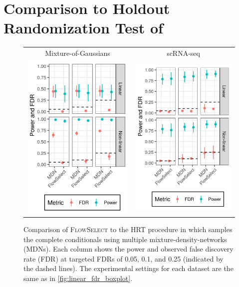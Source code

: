 \documentclass{article}
\newcommand{\FlowSelect}{\textsc{FlowSelect}\xspace}
\begin{document}
\section{Comparison to Holdout Randomization Test of \citet{tanseyHoldoutRandomizationTest2019}} \label{sec:hrt_ablation}
\begin{figure}[!h]
  \centering
    \begin{tabular}{cc}
    Mixture-of-Gaussians & scRNA-seq \\
    \includegraphics[width=0.30\linewidth]{./fig/gaussian_ar_mixture_d100_n100000_rho0.98__meanplots_hrt.png}
        &\includegraphics[width=0.30\linewidth]{./fig/rnasq_cor_a40_n10_nv100_nvc5_nt100000__meanplots_hrt.png}
            \end{tabular}
            \caption{Comparison of \FlowSelect to the HRT procedure in \citet{tanseyHoldoutRandomizationTest2019} which samples the complete conditionals using multiple mixture-density-networks (MDNs). Each column shows the power and observed false discovery rate (FDR) at targeted FDRs of 0.05, 0.1, and 0.25 (indicated by the dashed lines).
              The experimental settings for each dataset are the same as in \cref{fig:linear_fdr_boxplot}.}
    \label{fig:gaussian_hrt}
  \end{figure}

  \clearpage
\end{document}
